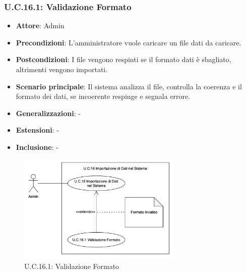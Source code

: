 \subsubsection{U.C.16.1: Validazione Formato}
\begin{itemize}
    \item \textbf{Attore}: Admin
    \item \textbf{Precondizioni}: L’amministratore vuole caricare un file dati da caricare.
    \item \textbf{Postcondizioni}: I file vengono respinti se il formato dati è sbagliato, altrimenti vengono importati.
    \item \textbf{Scenario principale}: Il sistema analizza il file, controlla la coerenza e il formato dei dati, 
    se incoerente respinge e segnala errore.
    \item \textbf{Generalizzazioni}: -
    \item \textbf{Estensioni}: -
    \item \textbf{Inclusione}: -
\end{itemize}
\begin{figure}[H]
    \centering
    \includegraphics[width=0.7\textwidth]{img/UC16.1.png}
    \caption{U.C.16.1: Validazione Formato}
\end{figure}
\newpage

